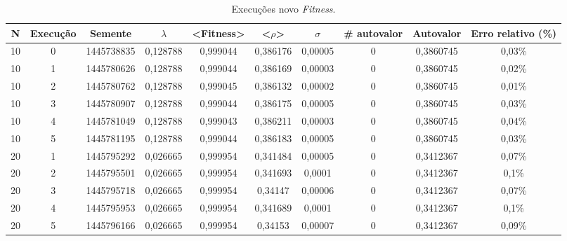 	\begin{landscape}
\begin{center}
\begin{table}[htbp]
\caption{Execuções novo \textit{Fitness}.}
\label{tab:execucoesNovoFitness}
\begin{tabular}{cccccccccc}
\hline \hline
   \textbf{N} & \textbf{Execução} & \textbf{Semente} & \textbf{$\lambda$} & \textbf{<Fitness>} & \textbf{<$\rho$>} & \textbf{$\sigma$} & \textbf{\# autovalor} & \textbf{Autovalor} & \textbf{Erro relativo (\%)} \\
\hline \hline
        10 &          0 & 1445738835 &   0,128788 &   0,999044 &   0,386176 &    0,00005 &          0 &  0,3860745 &     0,03\% \\
\hline
        10 &          1 & 1445780626 &   0,128788 &   0,999044 &   0,386169 &    0,00003 &          0 &  0,3860745 &     0,02\% \\
\hline
        10 &          2 & 1445780762 &   0,128788 &   0,999045 &   0,386132 &    0,00002 &          0 &  0,3860745 &     0,01\% \\
\hline
        10 &          3 & 1445780907 &   0,128788 &   0,999044 &   0,386175 &    0,00005 &          0 &  0,3860745 &     0,03\% \\
\hline
        10 &          4 & 1445781049 &   0,128788 &   0,999043 &   0,386211 &    0,00003 &          0 &  0,3860745 &     0,04\% \\
\hline
        10 &          5 & 1445781195 &   0,128788 &   0,999044 &   0,386183 &    0,00005 &          0 &  0,3860745 &     0,03\% \\
\hline
        20 &          1 & 1445795292 &   0,026665 &   0,999954 &   0,341484 &    0,00005 &          0 &  0,3412367 &     0,07\% \\
\hline
        20 &          2 & 1445795501 &   0,026665 &   0,999954 &   0,341693 &     0,0001 &          0 &  0,3412367 &      0,1\% \\
\hline
        20 &          3 & 1445795718 &   0,026665 &   0,999954 &    0,34147 &    0,00006 &          0 &  0,3412367 &     0,07\% \\
\hline
        20 &          4 & 1445795953 &   0,026665 &   0,999954 &   0,341689 &     0,0001 &          0 &  0,3412367 &      0,1\% \\
\hline
        20 &          5 & 1445796166 &   0,026665 &   0,999954 &    0,34153 &    0,00007 &          0 &  0,3412367 &     0,09\% \\

\end{tabular}
\end{table}
\end{center}
\end{landscape}
